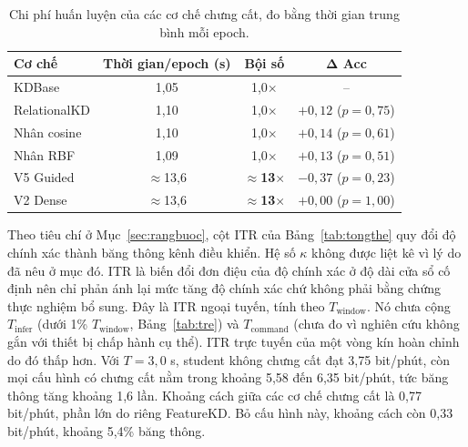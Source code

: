 \begin{table}[!htbp]
\centering
\caption{Chi phí huấn luyện của các cơ chế chưng cất, đo bằng thời gian
trung bình mỗi epoch.}
\label{tab:chiphi}
\begin{tabular}{lccc}
\toprule
\textbf{Cơ chế} & \textbf{Thời gian/epoch (s)} & \textbf{Bội số} & $\boldsymbol{\Delta}$ \textbf{Acc} \\
\midrule
KDBase & 1,05 & 1,0$\times$ & -- \\
RelationalKD & 1,10 & 1,0$\times$ & $+0{,}12$ ($p = 0{,}75$) \\
Nhân cosine & 1,10 & 1,0$\times$ & $+0{,}14$ ($p = 0{,}61$) \\
Nhân RBF & 1,09 & 1,0$\times$ & $+0{,}13$ ($p = 0{,}51$) \\
V5 Guided & $\approx$13,6 & \textbf{$\approx$13}$\boldsymbol{\times}$ & $-0{,}37$ ($p = 0{,}23$) \\
V2 Dense & $\approx$13,6 & \textbf{$\approx$13}$\boldsymbol{\times}$ & $+0{,}00$ ($p = 1{,}00$) \\
\bottomrule
\end{tabular}
\end{table}
\FloatBarrier

Theo tiêu chí ở Mục~\ref{sec:rangbuoc}, cột ITR của Bảng~\ref{tab:tongthe}
quy đổi độ chính xác thành băng thông kênh điều khiển. Hệ số $\kappa$
không được liệt kê vì lý do đã nêu ở mục đó. ITR là biến đổi đơn điệu của
độ chính xác ở độ dài cửa sổ cố định nên chỉ phản ánh lại mức tăng độ
chính xác chứ không phải bằng chứng thực nghiệm bổ sung. Đây là ITR ngoại
tuyến, tính theo $T_{\mathrm{window}}$. Nó chưa cộng $T_{\mathrm{infer}}$
(dưới 1\% $T_{\mathrm{window}}$, Bảng~\ref{tab:tre}) và
$T_{\mathrm{command}}$ (chưa đo vì nghiên cứu không gắn với thiết bị chấp
hành cụ thể). ITR trực tuyến của một vòng kín hoàn chỉnh do đó thấp hơn.
Với $T = 3{,}0$ s, student không chưng cất đạt 3,75 bit/phút, còn mọi cấu
hình có chưng cất nằm trong khoảng 5,58 đến 6,35 bit/phút, tức băng thông
tăng khoảng 1,6 lần. Khoảng cách giữa các cơ chế chưng cất là 0,77
bit/phút, phần lớn do riêng FeatureKD. Bỏ cấu hình này, khoảng cách còn 0,33
bit/phút, khoảng 5,4\% băng thông.

